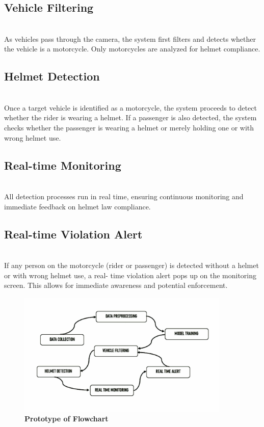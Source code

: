 \begin{refsection}
\subsection {Vehicle Filtering} \\
As vehicles pass through the camera, the system first filters and detects whether the vehicle is a motorcycle. Only motorcycles are analyzed for helmet compliance.

\subsection {Helmet Detection} \\
Once a target vehicle is identified as a motorcycle, the system proceeds to detect whether the rider is wearing a helmet. If a passenger is also detected, the system checks whether the passenger is wearing a helmet or merely holding one or with wrong helmet use.

\subsection {Real-time Monitoring} \\
All detection processes run in real time, ensuring continuous monitoring and immediate feedback on helmet law compliance.

\subsection {Real-time Violation Alert} \\
If any person on the motorcycle (rider or passenger) is detected without a helmet or with wrong helmet use, a real- time violation alert pops up on the monitoring screen. This allows for immediate awareness and potential enforcement.


\begin{figure}[H]
    \centering
    \includegraphics[width=0.9\textwidth]{figures/Fig 5.jpg}
    \caption{\textbf{Prototype of Flowchart}}
    \label{figures/Fig 5.jpg}
\end{figure}


\end{refsection}
